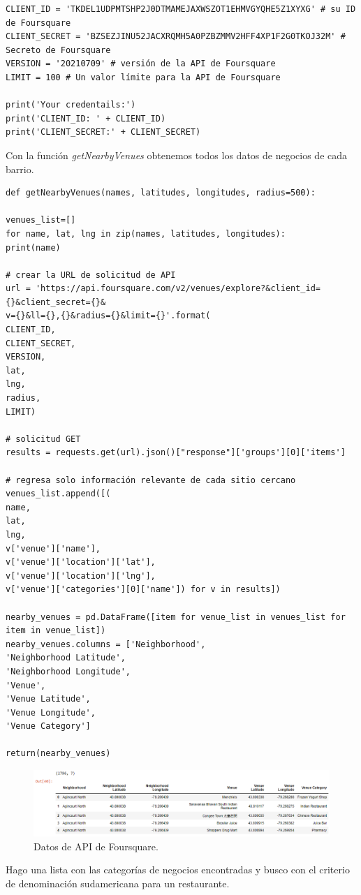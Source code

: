 \documentclass[10pt,a4paper,arial, spanish]{article}
\begin{document}
\begin{verbatim}
CLIENT_ID = 'TKDEL1UDPMTSHP2J0DTMAMEJAXWSZOT1EHMVGYQHE5Z1XYXG' # su ID de Foursquare
CLIENT_SECRET = 'BZSEZJINU52JACXRQMH5A0PZBZMMV2HFF4XP1F2G0TKOJ32M' # Secreto de Foursquare
VERSION = '20210709' # versión de la API de Foursquare
LIMIT = 100 # Un valor límite para la API de Foursquare

print('Your credentails:')
print('CLIENT_ID: ' + CLIENT_ID)
print('CLIENT_SECRET:' + CLIENT_SECRET)
\end{verbatim}
Con la función \emph{getNearbyVenues} obtenemos todos los datos de negocios de cada barrio.
\begin{verbatim}
def getNearbyVenues(names, latitudes, longitudes, radius=500):

venues_list=[]
for name, lat, lng in zip(names, latitudes, longitudes):
print(name)

# crear la URL de solicitud de API
url = 'https://api.foursquare.com/v2/venues/explore?&client_id={}&client_secret={}&
v={}&ll={},{}&radius={}&limit={}'.format(
CLIENT_ID, 
CLIENT_SECRET, 
VERSION, 
lat, 
lng, 
radius, 
LIMIT)

# solicitud GET
results = requests.get(url).json()["response"]['groups'][0]['items']

# regresa solo información relevante de cada sitio cercano
venues_list.append([(
name, 
lat, 
lng, 
v['venue']['name'], 
v['venue']['location']['lat'], 
v['venue']['location']['lng'],  
v['venue']['categories'][0]['name']) for v in results])

nearby_venues = pd.DataFrame([item for venue_list in venues_list for item in venue_list])
nearby_venues.columns = ['Neighborhood', 
'Neighborhood Latitude', 
'Neighborhood Longitude', 
'Venue', 
'Venue Latitude', 
'Venue Longitude', 
'Venue Category']

return(nearby_venues)
\end{verbatim}

\begin{figure}[h]
	\centering
	\includegraphics[scale=0.4]{df6}
	\caption[Datos de API de Foursquare.]{Datos de API de Foursquare.}
	\label{fig:df6}
\end{figure}
Hago una lista con las categorías de negocios encontradas y busco con el criterio de denominación sudamericana para un restaurante.
\end{document}
